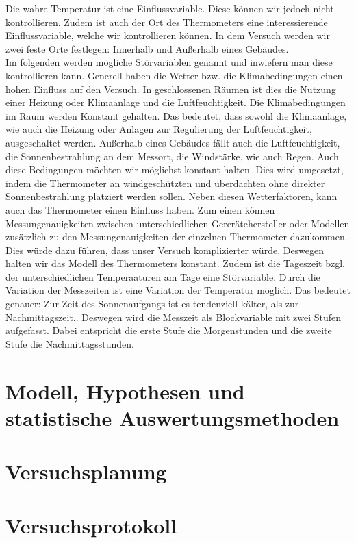 \documentclass[ ngerman, fontsize= 12pt, paper=a4, headings=big, titlepage=true]{article}
\begin{document}
Die wahre Temperatur ist eine Einflussvariable. Diese können wir jedoch nicht kontrollieren.  Zudem ist auch der Ort des Thermometers eine interessierende Einflussvariable, welche wir kontrollieren können. In dem Versuch werden wir zwei feste Orte festlegen: Innerhalb und Außerhalb eines Gebäudes. \\

Im folgenden werden mögliche Störvariablen genannt und inwiefern man diese kontrollieren kann. Generell haben die Wetter-bzw. die Klimabedingungen einen hohen Einfluss auf den Versuch.  In geschlossenen Räumen ist dies die Nutzung einer Heizung oder Klimaanlage und die Luftfeuchtigkeit. Die Klimabedingungen im Raum werden Konstant gehalten. Das bedeutet, dass sowohl die Klimaanlage, wie auch die Heizung oder Anlagen zur Regulierung der Luftfeuchtigkeit, ausgeschaltet werden. Außerhalb eines Gebäudes fällt auch die Luftfeuchtigkeit, die Sonnenbestrahlung an dem Messort, die Windstärke, wie auch Regen. Auch diese Bedingungen möchten wir möglichst konstant halten. Dies wird umgesetzt, indem die Thermometer an windgeschützten und überdachten ohne direkter Sonnenbestrahlung platziert werden sollen. Neben diesen Wetterfaktoren, kann auch das Thermometer einen Einfluss haben. Zum einen können Messungenauigkeiten zwischen unterschiedlichen Gererätehersteller oder Modellen zusätzlich zu den Messungenauigkeiten der einzelnen Thermometer dazukommen. Dies würde dazu führen, dass unser Versuch komplizierter würde. Deswegen halten wir das Modell des Thermometers konstant. Zudem ist die Tageszeit bzgl. der unterschiedlichen Temperaaturen am Tage eine Störvariable. Durch die Variation der Messzeiten ist eine Variation der Temperatur möglich. Das bedeutet genauer: Zur Zeit des Sonnenaufgangs ist es tendenziell kälter, als zur Nachmittagszeit.\cite{WK2}. Deswegen wird die Messzeit als Blockvariable mit zwei Stufen aufgefasst. Dabei  entspricht die erste Stufe die Morgenstunden und die zweite Stufe die Nachmittagsstunden. 



\section{Modell, Hypothesen und statistische Auswertungsmethoden}
\section{Versuchsplanung}
\section{Versuchsprotokoll}
\end{document}
